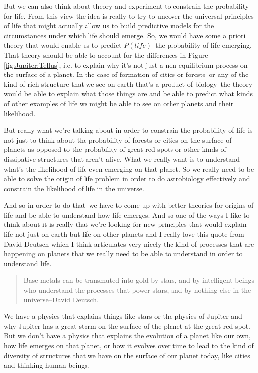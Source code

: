 \documentclass[]{article}
\begin{document}
But we can also think about theory and experiment to constrain the probability for life. From this view the idea is really to try to uncover the universal principles of life that might actually allow us to build predictive models for the circumstances under which life should emerge. So, we would have some a priori theory that would enable us to predict $P(life)$--the probability of life emerging.
That theory should be able to account for the differences in Figure \ref{fig:Jupiter:Tellus}, i.e. to explain why it's not just a non-equilibrium process on the surface of a planet. In the case of formation of cities or forests--or any of the kind of rich structure that we see on earth that's a product of biology--the theory would be able to explain what those things are and be able to predict what kinds of other
examples of life we might be able to see on other planets and their likelihood.

But really what we're talking about in
order to constrain the probability of
life is not just to think about the
probability of forests or cities on the
surface of planets as opposed to the
probability of great red spots or other
kinds of dissipative structures that
aren't alive. What we really want is to
understand what's the likelihood of life
even emerging on that planet.
So we really need to be able to solve
the origin of life problem in order to do
astrobiology effectively and constrain
the likelihood of life in the universe.

And so in order to do that, we have to
come up with better theories for origins
of life and be able to understand how
life emerges. And so one of the ways I
like to think about it is really that
we're looking for new principles that
would explain life not just on earth but
life on other planets and I really love
this quote from David Deutsch which I
think articulates very nicely the kind
of processes that are happening on
planets that we really need to be able
to understand in order to understand
life. 

\begin{quotation}
	Base metals can be transmuted into gold by stars, and by intelligent beings who understand the processes that power stars, and by nothing else in the universe--David Deutsch\cite{deutsch2011beginning}.
\end{quotation}

We have a physics that explains things like stars or the physics of Jupiter and why Jupiter has a great storm on the surface of the planet at the great red spot.
But we don't have a physics that explains the evolution of a planet like our own, how life emerges on that planet, or how it evolves over time to lead to the kind of diversity of structures that we have on the surface of our planet today, like cities and
thinking human beings.
\end{document}
